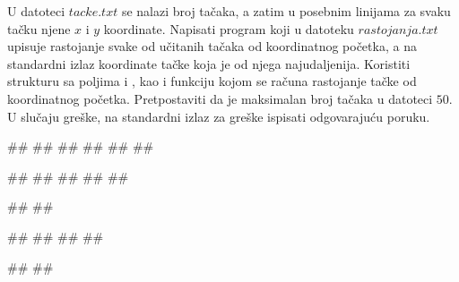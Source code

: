 \begin{Exercise}[label=p3_07] 
 U datoteci $tacke.txt$ se nalazi broj tačaka, a zatim u posebnim linijama 
 za svaku tačku njene $x$ i $y$ koordinate. 
 Napisati program koji u datoteku $rastojanja.txt$ upisuje rastojanje svake 
 od učitanih tačaka od koordinatnog početka, 
 a na standardni izlaz koordinate tačke koja je od njega najudaljenija. 
 Koristiti strukturu  sa poljima  i , 
 kao i funkciju kojom se računa rastojanje tačke od koordinatnog početka. 
 Pretpostaviti da je maksimalan broj tačaka u datoteci $50$.
 U slučaju greške, na standardni izlaz za greške ispisati odgovarajuću poruku.

\begin{miditest}
\begin{upotreba}{1}
##
##
##
##
##
##

##
##
##
##
##

#\naslovIzlaz#
##
\end{upotreba}
\end{miditest}
\begin{miditest}
\begin{upotreba}{2}
##
##
##
##

#\naslovIzlazZaGresku#
##
\end{upotreba}
\end{miditest}
\end{Exercise}
\begin{Answer}[ref=p3_07]
\end{Answer}


